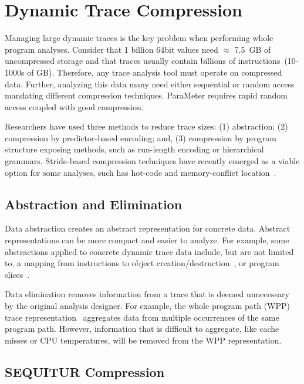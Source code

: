 \documentclass[defaultstyle,11pt]{thesis}
\begin{document}
\section{Dynamic Trace Compression}

Managing large dynamic traces is the key problem when performing whole
program analyses. Consider that 1 billion 64bit values need $\approx$
7.5~GB of uncompressed storage and that traces usually contain
billions of instructions~(10-1000s of GB). Therefore, any trace
analysis tool must operate on compressed data. Further, analyzing this
data many need either sequential or random access mandating
different compression techniques. ParaMeter requires rapid random
access coupled with good compression.

Researchers have used three methods to reduce trace sizes: (1)
abstraction; (2) compression by predictor-based encoding; and, (3)
compression by program structure exposing methods, such as run-length
encoding or hierarchical grammars.  Stride-based compression
techniques have recently emerged as a viable option for some analyses,
such has hot-code and memory-conflict
location~\cite{minjang:10:micro}.

\subsection{Abstraction and Elimination}

Data abstraction creates an abstract representation for concrete data.
Abstract representations can be more compact and easier to analyze.
For example, some abstractions applied to concrete dynamic trace data
include, but are not limited to, a mapping from instructions to object
creation/destruction~\cite{sridharan:07:pldi}, or program
slices~\cite{zhang:04:icse}.

Data elimination removes information from a trace that is deemed
unnecessary by the original analysis designer.  For example, the whole
program path (WPP) trace representation~\cite{larus:99:pldi}
aggregates data from multiple occurrences of the same program
path.  However, information that is difficult to aggregate, like cache
misses or CPU temperatures, will be removed from the WPP
representation.

\subsection{SEQUITUR Compression}
\end{document}

